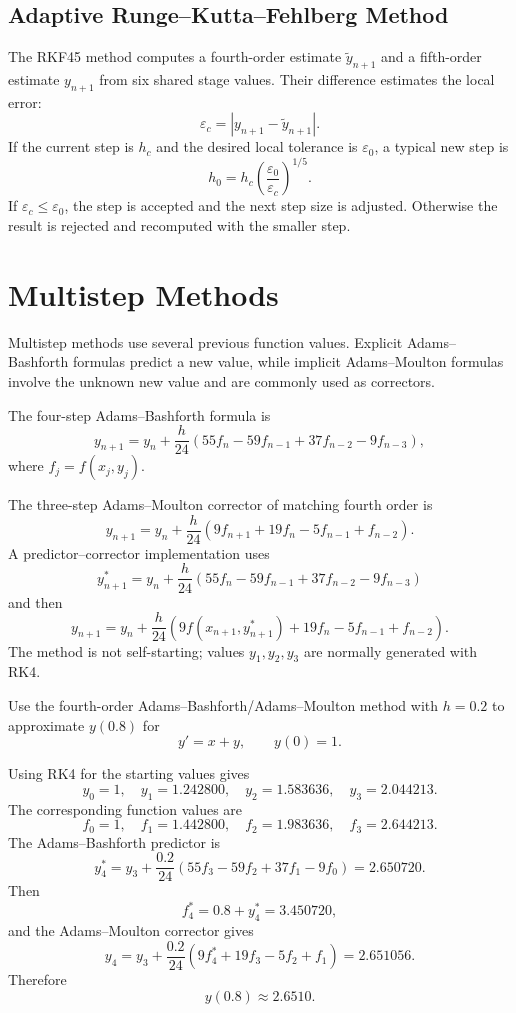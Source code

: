 \subsection{Adaptive Runge--Kutta--Fehlberg Method}

The RKF45 method computes a fourth-order estimate $\widetilde y_{n+1}$ and a fifth-order estimate $y_{n+1}$ from six shared stage values.  Their difference estimates the local error:
\[
 \varepsilon_c=|y_{n+1}-\widetilde y_{n+1}|.
\]
If the current step is $h_c$ and the desired local tolerance is $\varepsilon_0$, a typical new step is
\[
 h_0=h_c\left(\frac{\varepsilon_0}{\varepsilon_c}\right)^{1/5}.
\]
If $\varepsilon_c\le\varepsilon_0$, the step is accepted and the next step size is adjusted.  Otherwise the result is rejected and recomputed with the smaller step.

\section{Multistep Methods}

Multistep methods use several previous function values.  Explicit Adams--Bashforth formulas predict a new value, while implicit Adams--Moulton formulas involve the unknown new value and are commonly used as correctors.

The four-step Adams--Bashforth formula is
\[
 y_{n+1}=y_n+\frac h{24}
 \left(55f_n-59f_{n-1}+37f_{n-2}-9f_{n-3}\right),
\]
where $f_j=f(x_j,y_j)$.

The three-step Adams--Moulton corrector of matching fourth order is
\[
 y_{n+1}=y_n+\frac h{24}
 \left(9f_{n+1}+19f_n-5f_{n-1}+f_{n-2}\right).
\]
A predictor--corrector implementation uses
\[
 y_{n+1}^{*}=y_n+\frac h{24}
 \left(55f_n-59f_{n-1}+37f_{n-2}-9f_{n-3}\right)
\]
and then
\[
 y_{n+1}=y_n+\frac h{24}
 \left(9f(x_{n+1},y_{n+1}^{*})+19f_n-5f_{n-1}+f_{n-2}\right).
\]
The method is not self-starting; values $y_1,y_2,y_3$ are normally generated with RK4.

\begin{example}
Use the fourth-order Adams--Bashforth/Adams--Moulton method with $h=0.2$ to approximate $y(0.8)$ for
\[
 y'=x+y,
 \qquad y(0)=1.
\]
\end{example}

\begin{solution}[6.2cm]
Using RK4 for the starting values gives
\[
 y_0=1,
 \quad y_1=1.242800,
 \quad y_2=1.583636,
 \quad y_3=2.044213.
\]
The corresponding function values are
\[
 f_0=1,
 \quad f_1=1.442800,
 \quad f_2=1.983636,
 \quad f_3=2.644213.
\]
The Adams--Bashforth predictor is
\[
 y_4^*=y_3+\frac{0.2}{24}
 (55f_3-59f_2+37f_1-9f_0)
 =2.650720.
\]
Then
\[
 f_4^*=0.8+y_4^*=3.450720,
\]
and the Adams--Moulton corrector gives
\[
 y_4=y_3+\frac{0.2}{24}
 (9f_4^*+19f_3-5f_2+f_1)
 =2.651056.
\]
Therefore
\[
 y(0.8)\approx2.6510.
\]
\end{solution}

